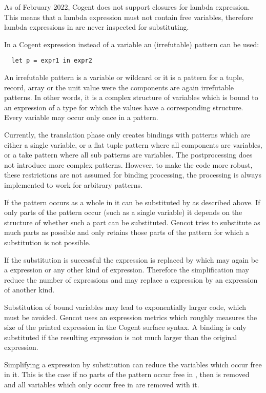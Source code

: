 As of February 2022, Cogent does not support closures for lambda expression. This means that a lambda expression must not
contain free variables, therefore lambda expressions in  are never inspected for substituting.

In a Cogent  expression instead of a variable  an (irrefutable) pattern  can be used:
\begin{verbatim}
  let p = expr1 in expr2
\end{verbatim}
An irrefutable pattern
is a variable or wildcard or it is a pattern for a tuple, record, array or the unit value were the components are again
irrefutable patterns. In other words, it is a complex structure of variables which is bound to an expression 
of a type for which the values have a corresponding structure. Every variable may occur only once in a pattern.

Currently, the translation phase only creates bindings with patterns which are either a single variable, or a flat tuple pattern where
all components are variables, or a take pattern where all sub patterns are variables. The postprocessing does not
introduce more complex patterns. However, to make the code more robust, these restrictions are not assumed for binding processing,
the processing is always implemented to work for arbitrary patterns.

If the pattern occurs as a whole in  it can be
substituted by  as described above. If only parts of the pattern occur (such as a single variable) it depends
on the structure of  whether such a part can be substituted. Gencot tries to substitute as much parts as possible 
and only retains those parts of the pattern for which a substitution is not possible.

If the substitution is successful the  expression is replaced by  which may again be a 
expression or any other kind of expression. Therefore the simplification may reduce the number of  expressions
and may replace a  expression by an expression of another kind.

Substitution of bound variables may lead to exponentially larger code, which must be avoided. Gencot uses an expression metrics
which roughly measures the size of the printed expression in the Cogent surface syntax. A binding is only substituted if the 
resulting expression is not much larger than the original  expression.

Simplifying a  expression by substitution can reduce the variables which occur free in it. This is the case if no
parts of the pattern  occur free in , then  is removed and all variables which only occur free
in  are removed with it.


